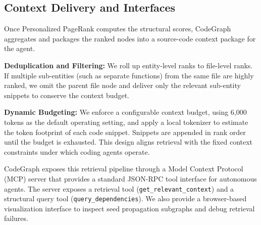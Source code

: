 \subsection{Context Delivery and Interfaces}

Once Personalized PageRank computes the structural scores, CodeGraph aggregates and packages the ranked nodes into a source-code context package for the agent.

\textbf{Deduplication and Filtering:} We roll up entity-level ranks to file-level ranks. If multiple sub-entities (such as separate functions) from the same file are highly ranked, we omit the parent file node and deliver only the relevant sub-entity snippets to conserve the context budget.

\textbf{Dynamic Budgeting:} We enforce a configurable context budget, using 6,000 tokens as the default operating setting, and apply a local tokenizer to estimate the token footprint of each code snippet. Snippets are appended in rank order until the budget is exhausted. This design aligns retrieval with the fixed context constraints under which coding agents operate.

CodeGraph exposes this retrieval pipeline through a Model Context Protocol (MCP) server that provides a standard JSON-RPC tool interface for autonomous agents. The server exposes a retrieval tool (\texttt{get\_relevant\_context}) and a structural query tool (\texttt{query\_dependencies}). We also provide a browser-based visualization interface to inspect seed propagation subgraphs and debug retrieval failures.
